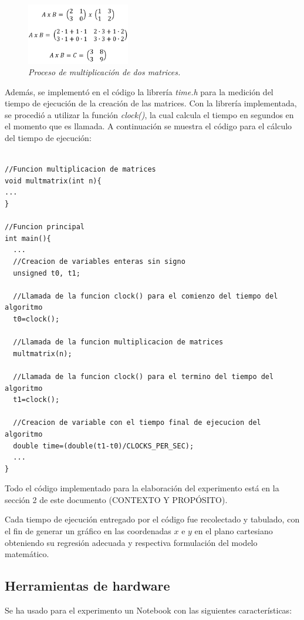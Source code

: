 \documentclass[11pt, twocolumn]{llncs}
\begin{document}
\begin{figure}
\caption{\textit{\label{fig:multiplicacion}Proceso de multiplicación de dos matrices.}}
\centering
\includegraphics[width=0.4\textwidth]{multiplicacion.png}
\end{figure}

Además, se implementó en el código la librería \textit{time.h} para la medición del tiempo de ejecución de la creación de las matrices. Con la librería implementada, se procedió a utilizar la función \textit{clock()}, la cual calcula el tiempo en segundos en el momento que es llamada. A continuación se muestra el código para el cálculo del tiempo de ejecución:

\lstset{language=, breaklines=true, basicstyle=\footnotesize}
\begin{lstlisting}[frame=single]

//Funcion multiplicacion de matrices
void multmatrix(int n){
...
}

//Funcion principal
int main(){
  ...
  //Creacion de variables enteras sin signo
  unsigned t0, t1;
  
  //Llamada de la funcion clock() para el comienzo del tiempo del algoritmo
  t0=clock();
  
  //Llamada de la funcion multiplicacion de matrices
  multmatrix(n);
  
  //Llamada de la funcion clock() para el termino del tiempo del algoritmo
  t1=clock();
  
  //Creacion de variable con el tiempo final de ejecucion del algoritmo
  double time=(double(t1-t0)/CLOCKS_PER_SEC);
  ...
}

\end{lstlisting}

Todo el código implementado para la elaboración del experimento está en la sección 2 de este documento (CONTEXTO Y PROPÓSITO).

Cada tiempo de ejecución entregado por el código fue recolectado y tabulado, con el fin de generar un gráfico en las coordenadas $x$ e $y$ en el plano cartesiano obteniendo su regresión adecuada y respectiva formulación del modelo matemático.

\subsection{Herramientas de hardware}
Se ha usado para el experimento un Notebook con las siguientes características:
\end{document}
